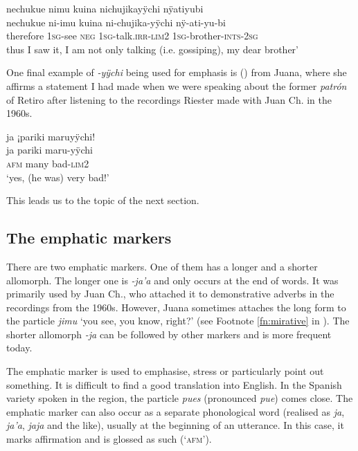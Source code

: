 \ea\label{ex:lim2-5}
\begingl
\glpreamble nechukue nimu kuina nichujikayÿchi nÿatiyubi\\
\gla nechukue ni-imu kuina ni-chujika-yÿchi nÿ-ati-yu-bi\\
\glb therefore 1\textsc{sg}-see \textsc{neg} 1\textsc{sg}-talk.\textsc{irr}-\textsc{lim}2 1\textsc{sg}-brother-\textsc{ints}-2\textsc{sg}\\
\glft thus I saw it, I am not only talking (i.e. gossiping), my dear brother’
\endgl
\trailingcitation{[ump-p110815sf.498]}
\xe

One final example of \textit{-yÿchi} being used for emphasis is () from Juana, where she affirms a statement I had made when we were speaking about the former \textit{patrón} of Retiro after listening to the recordings Riester made with Juan Ch. in the 1960s.

\ea\label{ex:lim2-6}
\begingl
\glpreamble ja ¡pariki maruyÿchi!\\
\gla ja pariki maru-yÿchi\\
\glb \textsc{afm} many bad-\textsc{lim}2\\
\glft ‘yes, (he was) very bad!’
\endgl
\trailingcitation{[jxx-p120430l-2.023-024]}
\xe

This leads us to the topic of the next section.

\subsection{The emphatic markers}\label{sec:EmphMarker}

There are two emphatic markers. One of them has a longer and a shorter allomorph. The longer one is \textit{-ja’a} and only occurs at the end of words. It was primarily used by Juan Ch., who attached it to demonstrative adverbs in the recordings from the 1960s. However, Juana sometimes attaches the long form to the  particle \textit{jimu} ‘you see, you know, right?’ (see Footnote \ref{fn:mirative} in ). The shorter allomorph \textit{-ja} can be followed by other markers and is more frequent today. 

The emphatic marker is used to emphasise, stress or particularly point out something. It is difficult to find a good translation into English. In the Spanish variety spoken in the region, the particle \textit{pues} (pronounced \textit{pue}) comes close. The emphatic marker can also occur as a separate phonological word (realised as \textit{ja}, \textit{ja’a}, \textit{jaja} and the like), usually at the beginning of an utterance. In this case, it marks affirmation and is glossed as such (‘\textsc{afm}’).

